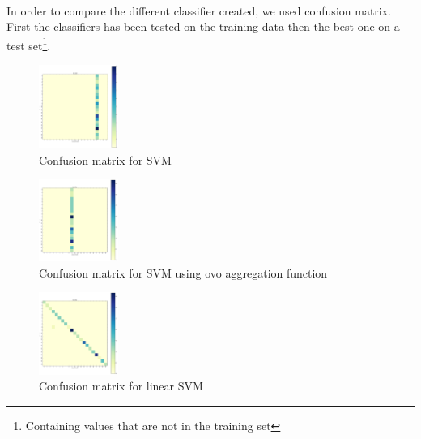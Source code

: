 \paragraph{}
In order to compare the different classifier created, we used confusion matrix. First the classifiers has been tested on the training data then the best one on a test set\footnote{Containing values that are not in the training set}. 

\begin{multicols}{3}
	\begin{figure}[H]
		\centering
		\includegraphics[width=0.23\textwidth]{classifier_svm}
		\caption{Confusion matrix for SVM}
		\label{svm}
	\end{figure}

	\begin{figure}[H]
		\centering
		\includegraphics[width=0.23\textwidth]{classifier_svm_ovo}
		\caption{Confusion matrix for SVM using ovo aggregation function}
		\label{svm_ovo}
	\end{figure}
	
	\begin{figure}[H]
		\centering
		\includegraphics[width=0.23\textwidth]{classifier_svm_linear}
		\caption{Confusion matrix for linear SVM}
		\label{svm_linear}
	\end{figure}
\end{multicols}

